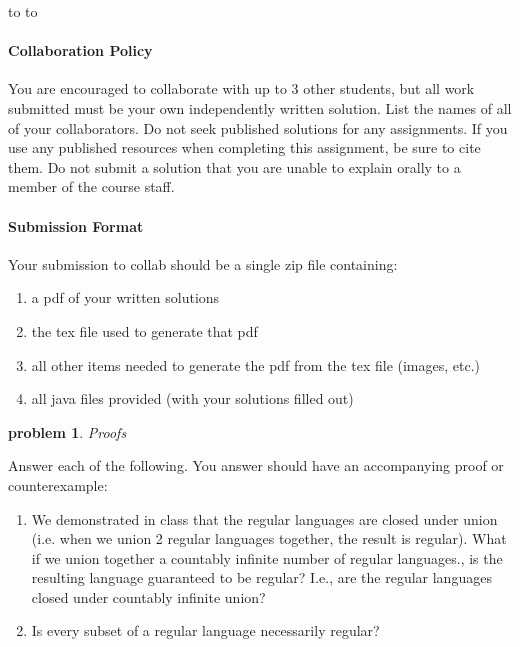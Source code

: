 \documentclass[10pt]{article}
\newcommand{\handout}{
   \renewcommand{\thepage}{H\hnumber-\arabic{page}}
   \noindent
   \begin{center}
      \vbox{
    \hbox to \columnwidth {\sc{\course} --- \prof \hfill}
    \vspace{-2mm}
    \hbox to \columnwidth {\sc due \MakeLowercase{\duedate} \duelocation\hfill {\Huge\color{mdb}H\hnumber.\yourid}}
      }
   \end{center}
   \vspace*{2mm}
}
\newtheorem{problem}{\sc\color{cit}problem}
\begin{document}
\thispagestyle{empty}
\handout
\paragraph{Collaboration Policy} You are encouraged to collaborate with up to 3 other students, but all work submitted must be your own independently written solution. List the names of all of your collaborators. Do not seek published solutions for any assignments. If you use any published resources when completing this assignment, be sure to cite them. Do not submit a solution that you are unable to explain orally to a member of the course staff.

\paragraph{Submission Format} Your submission to collab should be a single zip file containing:
\begin{enumerate}
    \item a pdf of your written solutions
    \item the tex file used to generate that pdf
    \item all other items needed to generate the pdf from the tex file (images, etc.)
    \item all java files provided (with your solutions filled out) 
\end{enumerate}






\begin{problem} Proofs \end{problem}
Answer each of the following. You answer should have an accompanying proof or counterexample:

\begin{enumerate}
    \item We demonstrated in class that the regular languages are closed under union (i.e. when we union 2 regular languages together, the result is regular). What if we union together a countably infinite number of regular languages., is the resulting language guaranteed to be regular? I.e., are the regular languages closed under countably infinite union?
    \item Is every subset of a regular language necessarily regular?
\end{enumerate}
\end{document}
